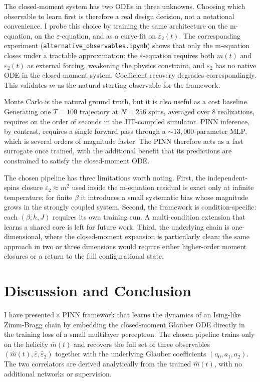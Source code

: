 \documentclass[conference]{IEEEtran}
\newcommand{\mhat}{\hat m(t)}
\newcommand{\mbar}{\bar m(t)}
\newcommand{\eps}{\varepsilon}
\newcommand{\epstwo}{\varepsilon_2}
\begin{document}
The closed-moment system has two ODEs in three unknowns. Choosing which
observable to learn first is therefore a real design decision, not a
notational convenience. I probe this choice by training the same
architecture on the m-equation, on the $\eps$-equation, and as a
curve-fit on $\bar\epstwo(t)$. The corresponding experiment
(\texttt{alternative\_observables.ipynb}) shows that only the m-equation
closes under a tractable approximation: the $\eps$-equation requires
both $m(t)$ and $\epstwo(t)$ as external forcing, weakening the physics
constraint, and $\epstwo$ has no native ODE in the closed-moment system.
Coefficient recovery degrades correspondingly. This validates $m$ as the
natural starting observable for the framework.


Monte Carlo is the natural ground truth, but it is also useful as a cost
baseline. Generating one $T = 100$ trajectory at $N = 256$ spins,
averaged over $8$ realizations, requires on the order of seconds in
the JIT-compiled simulator. PINN inference, by contrast, requires a single
forward pass through a $\sim 13{,}000$-parameter MLP, which is several
orders of magnitude faster. The PINN therefore acts as a fast surrogate
once trained, with the additional benefit that its predictions are
constrained to satisfy the closed-moment ODE.


The chosen pipeline has three limitations worth noting.
First, the independent-spins closure $\epstwo \approx m^2$ used inside
the m-equation residual is exact only at infinite temperature; for finite
$\beta$ it introduces a small systematic bias whose magnitude grows in
the strongly coupled system. Second, the framework is condition-specific:
each $(\beta, h, J)$ requires its own training run. A multi-condition
extension that learns a shared core is left for future work.
Third, the underlying chain is one-dimensional, where the closed-moment
expansion is particularly clean; the same approach in two or three
dimensions would require either higher-order moment closures or a return
to the full configurational state.

\section{Discussion and Conclusion}
\label{sec:conclusion}

I have presented a PINN framework that learns the dynamics of an
Ising-like Zimm-Bragg chain by embedding the closed-moment Glauber
ODE directly in the training loss of a small multilayer perceptron. The
chosen pipeline trains only on the helicity $\mbar$ and recovers
the full set of three observables $(\mhat, \hat\eps, \hat\epstwo)$
together with the underlying Glauber coefficients $(a_0, a_1, a_2)$.
The two correlators are derived analytically from the trained
$\mhat$, with no additional networks or supervision.
\end{document}
